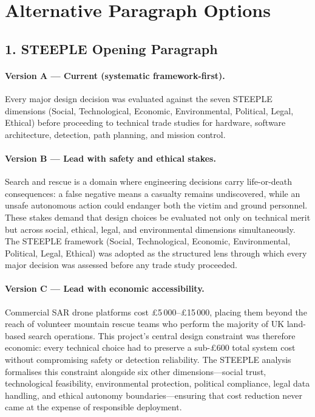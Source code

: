 
\section*{Alternative Paragraph Options}

\subsection*{1. STEEPLE Opening Paragraph}

\paragraph{{\color{blue} Version A --- Current (systematic framework-first).}}
Every major design decision was evaluated against the seven STEEPLE dimensions (Social, Technological, Economic, Environmental, Political, Legal, Ethical) before proceeding to technical trade studies for hardware, software architecture, detection, path planning, and mission control.

\paragraph{{\color{red} Version B --- Lead with safety and ethical stakes.}}
Search and rescue is a domain where engineering decisions carry life-or-death consequences: a false negative means a casualty remains undiscovered, while an unsafe autonomous action could endanger both the victim and ground personnel. These stakes demand that design choices be evaluated not only on technical merit but across social, ethical, legal, and environmental dimensions simultaneously. The STEEPLE framework (Social, Technological, Economic, Environmental, Political, Legal, Ethical) was adopted as the structured lens through which every major decision was assessed before any trade study proceeded.

\paragraph{{\color{olive} Version C --- Lead with economic accessibility.}}
Commercial SAR drone platforms cost \pounds5\,000--\pounds15\,000, placing them beyond the reach of volunteer mountain rescue teams who perform the majority of UK land-based search operations. This project's central design constraint was therefore economic: every technical choice had to preserve a sub-\pounds600 total system cost without compromising safety or detection reliability. The STEEPLE analysis formalises this constraint alongside six other dimensions---social trust, technological feasibility, environmental protection, political compliance, legal data handling, and ethical autonomy boundaries---ensuring that cost reduction never came at the expense of responsible deployment.


